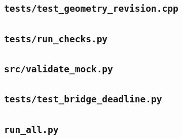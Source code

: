 \subsection*{\texttt{tests/test\_geometry\_revision.cpp}}

\subsection*{\texttt{tests/run\_checks.py}}

\subsection*{\texttt{src/validate\_mock.py}}

\subsection*{\texttt{tests/test\_bridge\_deadline.py}}

\clearpage
\subsection*{\texttt{run\_all.py}}

